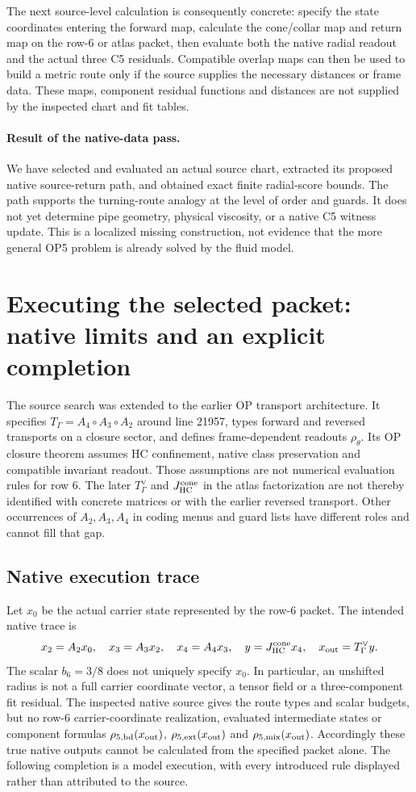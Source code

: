 \documentclass[11pt,a4paper]{article}
\begin{document}
The next source-level calculation is consequently concrete: specify the
state coordinates entering the forward map, calculate the cone/collar map
and return map on the row-6 or atlas packet, then evaluate both the native
radial readout and the actual three C5 residuals. Compatible overlap maps
can then be used to build a metric route only if the source supplies the
necessary distances or frame data. These maps, component residual functions
and distances are not supplied by the inspected chart and fit tables.

\paragraph{Result of the native-data pass.}
We have selected and evaluated an actual source chart, extracted its
proposed native source-return path, and obtained exact finite radial-score
bounds. The path supports the turning-route analogy at the level of order
and guards. It does not yet determine pipe geometry, physical viscosity,
or a native C5 witness update. This is a localized missing construction,
not evidence that the more general OP5 problem is already solved by the
fluid model.

\section{Executing the selected packet: native limits and an explicit completion}
\label{sec:packet-execution}
The source search was extended to the earlier OP transport architecture.
It specifies $T_\Gamma=A_4\circ A_3\circ A_2$ around line 21957, types
forward and reversed transports on a closure sector, and defines
frame-dependent readouts $\rho_\theta$. Its OP closure theorem assumes
HC confinement, native class preservation and compatible invariant readout.
Those assumptions are not numerical evaluation rules for row 6.
The later $T_\Gamma^\vee$ and $J_{\rm HC}^{\rm cone}$ in the atlas
factorization are not thereby identified with concrete matrices or with
the earlier reversed transport. Other occurrences of $A_2,A_3,A_4$ in
coding menus and guard lists have different roles and cannot fill that gap.

\subsection{Native execution trace}
Let $x_0$ be the actual carrier state represented by the row-6 packet.
The intended native trace is
\[
x_2=A_2x_0,\quad x_3=A_3x_2,\quad x_4=A_4x_3,
\quad y=J_{\rm HC}^{\rm cone}x_4,
\quad x_{\rm out}=T_\Gamma^\vee y.
\]
The scalar $b_6=3/8$ does not uniquely specify $x_0$. In particular,
an unshifted radius is not a full carrier coordinate vector, a tensor field
or a three-component fit residual. The inspected native source gives
the route types and scalar budgets, but no row-6 carrier-coordinate
realization, evaluated intermediate states or component formulas
$\rho_{5,\rm bd}(x_{\rm out})$, $\rho_{5,\rm ext}(x_{\rm out})$ and
$\rho_{5,\rm mix}(x_{\rm out})$.
Accordingly these true native outputs cannot be calculated from the
specified packet alone. The following completion is a model execution,
with every introduced rule displayed rather than attributed to the source.
\end{document}
